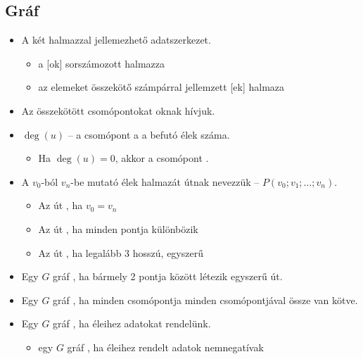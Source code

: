 \documentclass[../../main.tex]{subfiles}
\begin{document}
\subsection{Gráf}

\begin{itemize}
	\item A  két halmazzal jellemezhető adatszerkezet.
	      \begin{itemize}
		      \item a [ok] sorszámozott halmazza

		      \item az elemeket összekötő számpárral jellemzett [ek] halmaza
	      \end{itemize}

	\item Az összekötött csomópontokat oknak hívjuk.

	\item $\deg(u)$ -- a csomópont a a befutó élek száma.
	      \begin{itemize}
		      \item Ha $\deg(u) = 0$, akkor a csomópont .
	      \end{itemize}

	\item A $v_0$-ból $v_n$-be mutató élek halmazát
	      útnak nevezzük – $P \left( v_0; v_1; \dots ;v_n \right)$.
	      \begin{itemize}
		      \item Az út , ha $v_0 = v_n$
		      \item Az út , ha minden pontja különbözik
		      \item Az út , ha legalább 3 hosszú, egyszerű
	      \end{itemize}

	\item Egy $G$ gráf ,
	      ha bármely 2 pontja között létezik egyszerű út.

	\item Egy $G$ gráf ,
	      ha minden csomópontja minden csomópontjával össze van kötve.

	\item Egy $G$ gráf , ha éleihez adatokat rendelünk.
	      \begin{itemize}
		      \item egy $G$ gráf ,
		            ha éleihez rendelt adatok nemnegatívak
	      \end{itemize}


\end{itemize}
\end{document}
